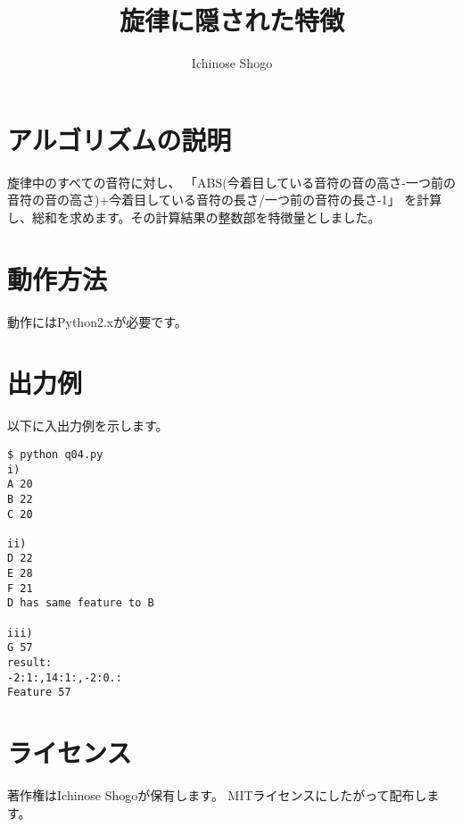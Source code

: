 \documentclass{jsarticle}
\title{旋律に隠された特徴}
\author{Ichinose Shogo}
\begin{document}
\maketitle

\section{アルゴリズムの説明}
旋律中のすべての音符に対し、
「ABS(今着目している音符の音の高さ-一つ前の音符の音の高さ)+今着目している音符の長さ/一つ前の音符の長さ-1」
を計算し、総和を求めます。その計算結果の整数部を特徴量としました。

\section{動作方法}
動作にはPython2.xが必要です。

\section{出力例}
以下に入出力例を示します。
\begin{verbatim}
$ python q04.py
i)
A 20
B 22
C 20

ii)
D 22
E 28
F 21
D has same feature to B

iii)
G 57
result:
-2:1:,14:1:,-2:0.:
Feature 57
\end{verbatim}

\section{ライセンス}
著作権はIchinose Shogoが保有します。
MITライセンスにしたがって配布します。
\end{document}
